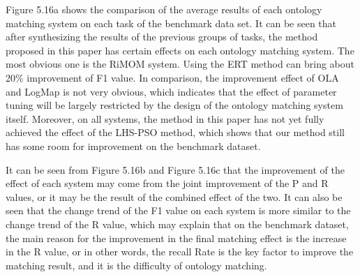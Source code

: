 \documentclass[twoside]{article}
\begin{document}
Figure 5.16a shows the comparison of the average results of each ontology matching system on each task of the benchmark data set. It can be seen that after synthesizing the results of the previous groups of tasks, the method proposed in this paper has certain effects on each ontology matching system. The most obvious one is the RiMOM system. Using the ERT method can bring about 20\% improvement of F1 value.
In comparison, the improvement effect of OLA and LogMap is not very obvious, which indicates that the effect of parameter tuning will be largely restricted by the design of the ontology matching system itself.
Moreover, on all systems, the method in this paper has not yet fully achieved the effect of the LHS-PSO method, which shows that our method still has some room for improvement on the benchmark dataset.

It can be seen from Figure 5.16b and Figure 5.16c that the improvement of the effect of each system may come from the joint improvement of the P and R values, or it may be the result of the combined effect of the two.
It can also be seen that the change trend of the F1 value on each system is more similar to the change trend of the R value, which may explain that on the benchmark dataset, the main reason for the improvement in the final matching effect is the increase in the R value, or in other words, the recall Rate is the key factor to improve the matching result, and it is the difficulty of ontology matching.
\end{document}
